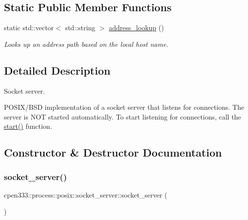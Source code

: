 \subsection*{Static Public Member Functions}
\begin{DoxyCompactItemize}
\item 
static std\+::vector$<$ std\+::string $>$ \hyperlink{classcpen333_1_1process_1_1posix_1_1socket__server_a2ff19c8146dd6f5dcb72606311fffedd}{address\+\_\+lookup} ()
\begin{DoxyCompactList}\small\item\em Looks up an address path based on the local host name. \end{DoxyCompactList}\end{DoxyCompactItemize}


\subsection{Detailed Description}
Socket server. 

P\+O\+S\+I\+X/\+B\+SD implementation of a socket server that listens for connections. The server is N\+OT started automatically. To start listening for connections, call the \hyperlink{classcpen333_1_1process_1_1posix_1_1socket__server_a0d02be64318ad8d7686633f1bdddc677}{start()} function. 

\subsection{Constructor \& Destructor Documentation}
\mbox{\label{classcpen333_1_1process_1_1posix_1_1socket__server_a2880c0745a27f52a545619f48f7e06bd}} 
\subsubsection{\texorpdfstring{socket\+\_\+server()}{socket\_server()}\hspace{0.1cm}{\footnotesize\ttfamily [1/2]}}
{\footnotesize\ttfamily cpen333\+::process\+::posix\+::socket\+\_\+server\+::socket\+\_\+server (\begin{DoxyParamCaption}{ }\end{DoxyParamCaption})\hspace{0.3cm}{\ttfamily [inline]}}




